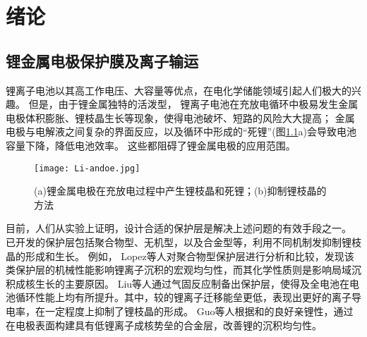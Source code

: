 \chapter{绪论}
\section{锂金属电极保护膜及离子输运}

锂离子电池以其高工作电压、大容量等优点，在电化学储能领域引起人们极大的兴趣。
但是，由于锂金属独特的活泼型，
锂离子电池在充放电循环中极易发生金属电极体积膨胀、锂枝晶生长等现象，使得电池破坏、短路的风险大大提高；
金属电极与电解液之间复杂的界面反应，以及循环中形成的“死锂”(图\ref{fig:Li-anode}a)会导致电池容量下降，降低电池效率。
这些都阻碍了锂金属电极的应用范围。

\begin{figure}[htbp]
    \centering
    \texttt{[image: Li-andoe.jpg]}
    \caption{(a)锂金属电极在充放电过程中产生锂枝晶和死锂；(b)抑制锂枝晶的方法}
    \label{fig:Li-anode}
\end{figure}

目前，人们从实验上证明，设计合适的保护层是解决上述问题的有效手段之一。
已开发的保护层包括聚合物型、无机型，以及合金型等，利用不同机制发抑制锂枝晶的形成和生长。
例如， Lopez等人对聚合物型保护层进行分析和比较，发现该类保护层的机械性能影响锂离子沉积的宏观均匀性，而其化学性质则是影响局域沉积成核生长的主要原因。
Liu等人通过气固反应制备出保护层，使得及全电池在电池循环性能上均有所提升。其中，较的锂离子迁移能垒更低，表现出更好的离子导电率，在一定程度上抑制了锂枝晶的形成。
Guo等人根据和的良好亲锂性，通过在电极表面构建具有低锂离子成核势垒的合金层，改善锂的沉积均匀性。

